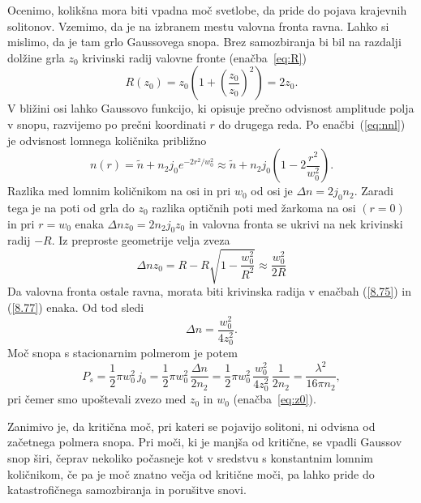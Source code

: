Ocenimo, kolikšna mora biti vpadna moč svetlobe, da pride do pojava krajevnih solitonov. 
Vzemimo, da je na izbranem mestu valovna fronta ravna. Lahko si mislimo,
da je tam grlo Gaussovega snopa. Brez samozbiranja bi bil na razdalji
dolžine grla $z_{0}$ krivinski radij valovne fronte (enačba~\ref{eq:R})
\begin{equation}
R(z_{0})=z_{0}\left( 1+\left(\frac{z_{0}}{z_{0}}\right)^{2}\right)=2z_{0}.
\label{8.75}
\end{equation}
V bližini osi lahko Gaussovo funkcijo, ki opisuje prečno odvisnost
amplitude polja v snopu, razvijemo po prečni koordinati $r$ do drugega
reda. Po enačbi~(\ref{eq:nnl}) je odvisnost lomnega količnika približno
\begin{equation}
n(r)=\tilde{n}+n_2 j_0 e^{-2r^2/w_0^2} \approx \tilde{n}+n_2 j_0 \left(1 - 2\frac{r^2}{w_0^2}\right).
\label{8.76}
\end{equation}
Razlika med lomnim količnikom na osi in pri $w_{0}$ od osi je $\Delta n= 2j_{0} n_{2}$.
Zaradi tega je na poti od grla do $z_0$ razlika optičnih poti med žarkoma na osi $(r=0)$ in 
pri $r= w_{0}$ enaka $\Delta nz_{0} = 2 n_2 j_0 z_0$ in valovna fronta se 
ukrivi na nek krivinski radij $-R$. Iz preproste geometrije velja zveza 
\begin{equation}
\Delta nz_{0}=R-R\sqrt{1-\frac{w_{0}^{2}}{R^{2}}}\approx \frac{w_{0}^{2}}{2R}
\label{8.77}
\end{equation}
Da valovna fronta ostale ravna, morata biti krivinska radija v
enačbah (\ref{8.75}) in (\ref{8.77}) enaka. Od tod sledi 
\begin{equation}
\Delta n=\frac{w_{0}^{2}}{4z_{0}^{2}}.
\label{8.78}
\end{equation}
Moč snopa s stacionarnim polmerom je potem 
\begin{equation}
P_{s}= \frac{1}{2}\pi w_0^2 \,j_0 = \frac{1}{2}\pi w_0^2 \, \frac{\Delta n}{2 n_2} = 
\frac{1}{2}\pi w_0^2 \,\frac{w_{0}^{2}}{4z_{0}^{2}}\,\frac{1}{2 n_2} = \frac{\lambda^2}{16 \pi n_2},
\label{8.79}
\end{equation}
pri čemer smo upoštevali zvezo med $z_0$ in $w_0$ (enačba~\ref{eq:z0}).

Zanimivo je, da kritična moč, pri kateri se pojavijo solitoni, ni odvisna od začetnega polmera snopa.
Pri moči, ki je manjša od kritične, se vpadli Gaussov snop širi, 
čeprav nekoliko počasneje kot v sredstvu s konstantnim lomnim količnikom, 
če pa je moč znatno večja od kritične moči, pa lahko
pride do katastrofičnega samozbiranja in porušitve snovi.

